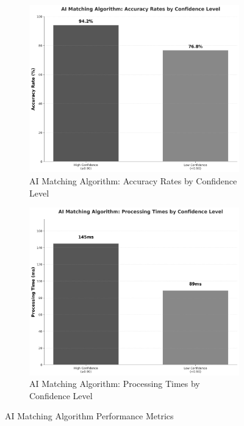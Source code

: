 \begin{figure}[htbp]
    \centering
    \begin{subfigure}[t]{0.48\textwidth}
        \centering
        \includegraphics[width=\textwidth]{figs/chapter4/ai_accuracy_rates.png}
        \caption{AI Matching Algorithm: Accuracy Rates by Confidence Level}
        \label{fig:ai_accuracy}
    \end{subfigure}
    \hfill
    \begin{subfigure}[t]{0.48\textwidth}
        \centering
        \includegraphics[width=\textwidth]{figs/chapter4/ai_processing_times.png}
        \caption{AI Matching Algorithm: Processing Times by Confidence Level}
        \label{fig:ai_processing}
    \end{subfigure}
    \caption{AI Matching Algorithm Performance Metrics}
    \label{fig:ai_matching_system}
\end{figure}

